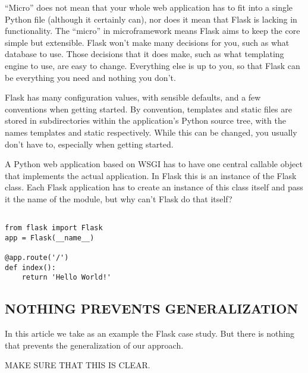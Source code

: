  “Micro” does not mean that your whole web application has to fit into a single Python file (although it certainly can), nor does it mean that Flask is lacking in functionality. The “micro” in microframework means Flask aims to keep the core simple but extensible. Flask won’t make many decisions for you, such as what database to use. Those decisions that it does make, such as what templating engine to use, are easy to change. Everything else is up to you, so that Flask can be everything you need and nothing you don’t.

 Flask has many configuration values, with sensible defaults, and a few conventions when getting started. By convention, templates and static files are stored in subdirectories within the application’s Python source tree, with the names templates and static respectively. While this can be changed, you usually don’t have to, especially when getting started.

 A Python web application based on WSGI has to have one central callable object that implements the actual application. In Flask this is an instance of the Flask class. Each Flask application has to create an instance of this class itself and pass it the name of the module, but why can’t Flask do that itself?

\begin{lstlisting}[style=custompython]

from flask import Flask
app = Flask(__name__)

@app.route('/')
def index():
    return 'Hello World!'

\end{lstlisting}


\subsection*{NOTHING PREVENTS GENERALIZATION}
In this article we take as an example the Flask case study.
But there is nothing that prevents the generalization of 
our approach. 

MAKE SURE THAT THIS IS CLEAR.
